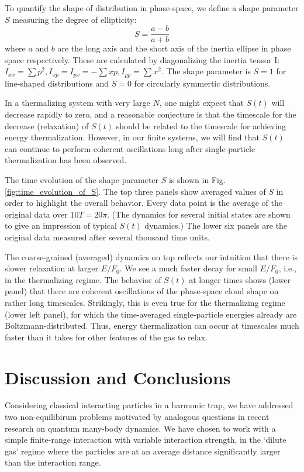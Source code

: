 \documentclass[a4paper, onecolumn]{revtex4-1}
\begin{document}
To quantify the shape of distribution in phase-space, we define a shape parameter $S$ measuring the
degree of ellipticity:
\begin{equation}
S=\frac{a-b}{a+b}
\end{equation}
where $a$ and $b$ are the long axis and the short axis of the inertia ellipse in phase space
respectively.  These are calculated by diagonalizing the inertia tensor I: $I_{xx}=\sum{p^2},
I_{xp}=I_{px}=-\sum{xp},I_{pp}=\sum{x^2}$.  The shape parameter is $S=1$ for line-shaped
distributions and $S=0$ for circularly symmertic distributions.  

In a thermalizing system with very large $N$, one might expect that $S(t)$ will decrease rapidly to
zero, and a reasonable conjecture is that the timescale for the decrease (relaxation) of $S(t)$
should be related to the timescale for achieving energy thermalization.  However, in our finite
systems, we will find that $S(t)$ can continue to perform coherent oscillations long after
single-particle thermalization has been observed.


The time evolution of the shape parameter $S$ is shown in Fig.\ref{fig:time_evolution_of_S}.
%
The top three panels show averaged values of $S$ in order to highlight the overall behavior.  Every
data point is the average of the original data over $10T = 20\pi$.  (The dynamics for several
initial states are shown to give an impression of typical $S(t)$ dynamics.)  The lower six panels
are the original data measured after several thousand time units.

The coarse-grained (averaged) dynamics on top reflects our intuition that there is slower relaxation
at larger $E/F_0$.  We see a much faster decay for small $E/F_0$, i.e., in the thermalizing regime.
%
The behavior of $S(t)$ at longer times shows (lower panel) that there are coherent oscillations of
the phase-space cloud shape on rather long timescales.  Strikingly, this is even true for the
thermalizing regime (lower left panel), for which the time-averaged single-particle energies already
are Boltzmann-distributed.  Thus, energy thermalization can occur at timescales much faster than it
takes for other features of the gas to relax.




\section{Discussion and Conclusions} \label{sec:concl} 

Considering classical interacting particles in a harmonic trap, we have addressed two
non-equilibirum problems motivated by analogous questions in recent research on quantum many-body
dynamics.  We have chosen to work with a simple finite-range interaction with variable interaction
strength, in the `dilute gas' regime where the particles are at an average distance significantly
larger than the interaction range.
\end{document}
